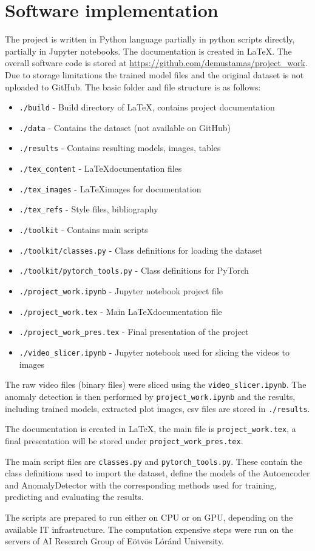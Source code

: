 \section{Software implementation} \label{sw_code}
The project is written in Python language partially in python scripts directly,
partially in Jupyter notebooks.
The documentation is created in \LaTeX.
The overall software code is stored at \url{https://github.com/demustamas/project_work}.
Due to storage limitations the trained model files and the original dataset is not uploaded to GitHub.
The basic folder and file structure is as follows:

\begin{itemize}
    \item \lstinline{./build} - Build directory of \LaTeX, contains project documentation
    \item \lstinline{./data} - Contains the dataset (not available on GitHub)
    \item \lstinline{./results} - Contains resulting models, images, tables
    \item \lstinline{./tex_content} - \LaTeX documentation files
    \item \lstinline{./tex_images} - \LaTeX images for documentation
    \item \lstinline{./tex_refs} - Style files, bibliography
    \item \lstinline{./toolkit} - Contains main scripts
    \item \lstinline{./toolkit/classes.py} - Class definitions for loading the dataset
    \item \lstinline{./toolkit/pytorch_tools.py} - Class definitions for PyTorch
    \item \lstinline{./project_work.ipynb} - Jupyter notebook project file
    \item \lstinline{./project_work.tex} - Main \LaTeX documentation file
    \item \lstinline{./project_work_pres.tex} - Final presentation of the project
    \item \lstinline{./video_slicer.ipynb} - Jupyter notebook used for slicing the videos to images
\end{itemize}

The raw video files (binary files) were sliced using the \lstinline{video_slicer.ipynb}.
The anomaly detection is then performed by \lstinline{project_work.ipynb} and the results,
including trained models, extracted plot images, csv files are stored in \lstinline{./results}.

The documentation is created in \LaTeX, the main file is \lstinline{project_work.tex},
a final presentation will be stored under \lstinline{project_work_pres.tex}.

The main script files are \lstinline{classes.py} and \lstinline{pytorch_tools.py}.
These contain the class definitions used to import the dataset, define the models
of the Autoencoder and AnomalyDetector with the corresponding methods used for training,
predicting and evaluating the results.

The scripts are prepared to run either on CPU or on GPU, depending on the available IT infrastructure.
The computation expensive steps were run on the servers of AI Research Group of Eötvös Lóránd University.
